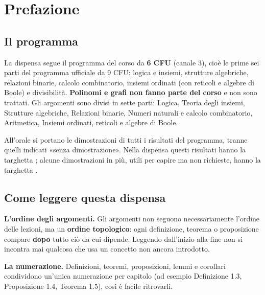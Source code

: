 \chapter{Prefazione}

\pagestyle{plain}

\section{Il programma}

La dispensa segue il programma del corso da \textbf{6 CFU} (canale 3), cioè le prime sei parti del programma ufficiale da 9 CFU:
logica e insiemi, strutture algebriche, relazioni binarie, calcolo combinatorio, insiemi ordinati (con reticoli e algebre di Boole)
e divisibilità. \textbf{Polinomi e grafi non fanno parte del corso} e non sono trattati.
Gli argomenti sono divisi in sette parti: Logica, Teoria degli insiemi, Strutture algebriche, Relazioni binarie, Numeri naturali
e calcolo combinatorio, Aritmetica, Insiemi ordinati, reticoli e algebre di Boole.

All'orale si portano le dimostrazioni di tutti i risultati del programma, tranne quelli indicati «senza dimostrazione». Nella
dispensa questi risultati hanno la targhetta ; alcune dimostrazioni in più, utili per capire ma
non richieste, hanno la targhetta .

\section{Come leggere questa dispensa}

\textbf{L'ordine degli argomenti.} Gli argomenti non seguono necessariamente l'ordine delle lezioni, ma un
\textbf{ordine topologico}: ogni definizione, teorema o proposizione compare \textbf{dopo} tutto ciò da cui dipende.
Leggendo dall'inizio alla fine non si incontra mai qualcosa che usa un concetto non ancora introdotto.

\textbf{La numerazione.} Definizioni, teoremi, proposizioni, lemmi e corollari condividono un'unica numerazione per
capitolo (ad esempio Definizione 1.3, Proposizione 1.4, Teorema 1.5), così è facile ritrovarli.


